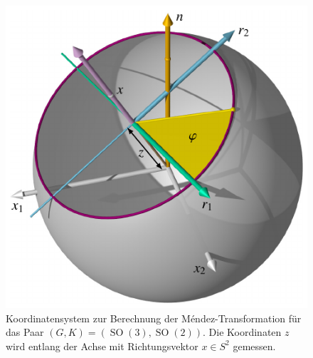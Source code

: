 %
%
%
\begin{figure}
\centering
\includegraphics{chapters/070-nichtkomm/images/coordinates.pdf}
\caption{Koordinatensystem zur Berechnung der Méndez-Transformation
für das Paar $(G,K)=(\operatorname{SO}(3),\operatorname{SO}(2))$.
Die Koordinaten $z$ wird entlang der Achse mit Richtungsvektor $x\in S^2$
gemessen.
\label{buch:nichtkomm:mendez:fig:coordinates}}
\end{figure}
